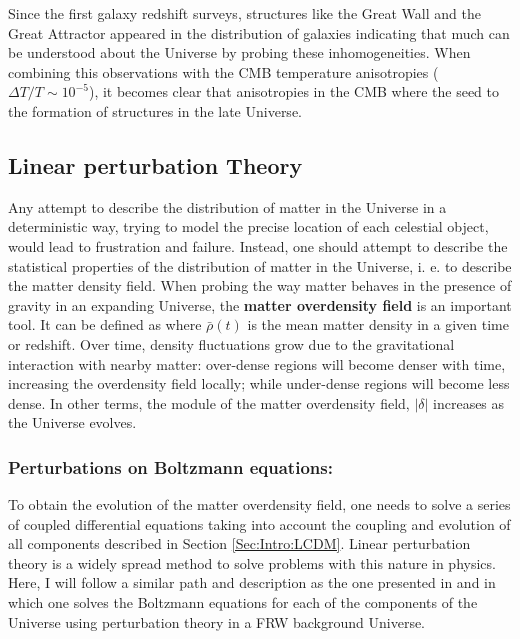 \qquad Since the first galaxy redshift surveys, structures like the Great Wall \citep{SloanGreatWall} and the Great Attractor \citep{ScharfLahav1992} appeared in the distribution of galaxies indicating that much can be understood about the Universe by probing these inhomogeneities. When combining this observations with the CMB temperature anisotropies ($\Delta T/T \sim 10^{-5}$), it becomes clear that anisotropies in the CMB where the seed to the formation of structures in the late Universe. 

\subsection{Linear perturbation Theory}\label{Sec:Intro:LinTheory}
Any attempt to describe the distribution of matter in the Universe in a deterministic way, trying to model the precise location of each celestial object, would lead to frustration and failure. Instead, one should attempt to describe the statistical properties of the distribution of matter in the Universe, i. e. to describe the matter density field. When probing the way matter behaves in the presence of gravity in an expanding Universe, the \textbf{matter overdensity field} is an important tool. It can be defined as
where $\bar{\rho}(t)$ is the mean matter density in a given time or redshift. Over time, density fluctuations grow due to the gravitational interaction with nearby matter: over-dense regions will become denser with time, increasing the overdensity field locally; while under-dense regions will become less dense. In other terms, the module of the matter overdensity field, $| \delta |$ increases as the Universe evolves.

\subsubsection{Perturbations on Boltzmann equations:}
To obtain the evolution of the matter overdensity field, one needs to solve a series of coupled differential equations taking into account the coupling and evolution of all components described in Section \ref{Sec:Intro:LCDM}. Linear perturbation theory is a widely spread method to solve problems with this nature in physics. Here, I will follow a similar path and description as the one presented in \cite{Peacock} and \cite{dods} in which one solves the Boltzmann equations for each of the components of the Universe using perturbation theory in a FRW background Universe. 

